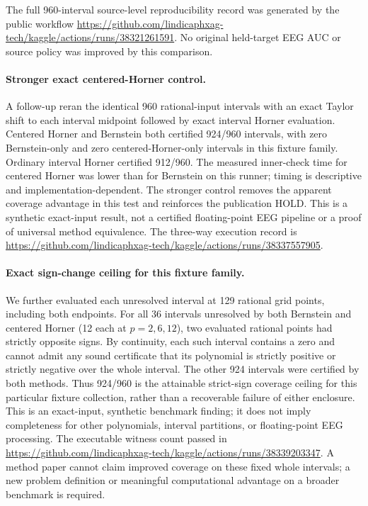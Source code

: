 The full 960-interval source-level reproducibility
record was generated by the public workflow
\url{https://github.com/lindicaphxag-tech/kaggle/actions/runs/38321261591}.
No original held-target EEG AUC or
source policy was improved by this comparison.

\paragraph{Stronger exact centered-Horner control.}
A follow-up reran the identical 960 rational-input intervals
with an exact Taylor shift to each interval midpoint followed
by exact interval Horner evaluation. Centered Horner and
Bernstein both certified 924/960 intervals, with zero
Bernstein-only and zero centered-Horner-only intervals in this
fixture family. Ordinary interval Horner certified 912/960.
The measured inner-check time for centered Horner was lower
than for Bernstein on this runner; timing is descriptive and
implementation-dependent. The stronger control removes the
apparent coverage advantage in this test and reinforces the
publication HOLD. This is a synthetic exact-input result,
not a certified floating-point EEG pipeline or a proof of
universal method equivalence. The three-way execution record
is \url{https://github.com/lindicaphxag-tech/kaggle/actions/runs/38337557905}.

\paragraph{Exact sign-change ceiling for this fixture family.}
We further evaluated each unresolved interval at 129 rational grid
points, including both endpoints. For all 36 intervals unresolved
by both Bernstein and centered Horner (12 each at $p=2,6,12$),
two evaluated rational points had strictly opposite signs.
By continuity, each such interval contains a zero and cannot
admit any sound certificate that its polynomial is strictly
positive or strictly negative over the whole interval.
The other 924 intervals were certified by both methods.
Thus 924/960 is the attainable strict-sign coverage ceiling
for this particular fixture collection, rather than a
recoverable failure of either enclosure. This is an exact-input,
synthetic benchmark finding; it does not imply completeness
for other polynomials, interval partitions, or floating-point EEG
processing. The executable witness count passed in
\url{https://github.com/lindicaphxag-tech/kaggle/actions/runs/38339203347}.
A method paper cannot claim improved coverage on these fixed
whole intervals; a new problem definition or meaningful
computational advantage on a broader benchmark is required.
